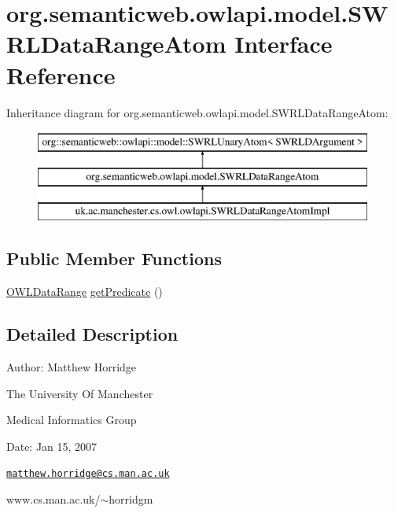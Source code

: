 \hypertarget{interfaceorg_1_1semanticweb_1_1owlapi_1_1model_1_1_s_w_r_l_data_range_atom}{\section{org.\-semanticweb.\-owlapi.\-model.\-S\-W\-R\-L\-Data\-Range\-Atom Interface Reference}
\label{interfaceorg_1_1semanticweb_1_1owlapi_1_1model_1_1_s_w_r_l_data_range_atom}
}
Inheritance diagram for org.\-semanticweb.\-owlapi.\-model.\-S\-W\-R\-L\-Data\-Range\-Atom\-:\begin{figure}[H]
\begin{center}
\leavevmode
\includegraphics[height=3.000000cm]{interfaceorg_1_1semanticweb_1_1owlapi_1_1model_1_1_s_w_r_l_data_range_atom}
\end{center}
\end{figure}
\subsection*{Public Member Functions}
\begin{DoxyCompactItemize}
\item 
\hyperlink{interfaceorg_1_1semanticweb_1_1owlapi_1_1model_1_1_o_w_l_data_range}{O\-W\-L\-Data\-Range} \hyperlink{interfaceorg_1_1semanticweb_1_1owlapi_1_1model_1_1_s_w_r_l_data_range_atom_a9a744a2d8c7af96d2789398e027eab92}{get\-Predicate} ()
\end{DoxyCompactItemize}


\subsection{Detailed Description}
Author\-: Matthew Horridge\par
 The University Of Manchester\par
 Medical Informatics Group\par
 Date\-: Jan 15, 2007\par
\par
 

\href{mailto:matthew.horridge@cs.man.ac.uk}{\tt matthew.\-horridge@cs.\-man.\-ac.\-uk}\par
 www.\-cs.\-man.\-ac.\-uk/$\sim$horridgm\par
\par
 

